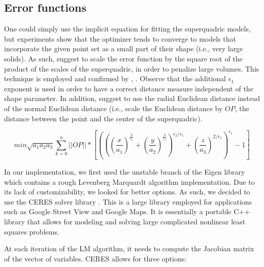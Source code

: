 \documentclass{article}
\begin{document}
\subsection*{Error functions}

One could simply use the implicit equation for fitting the superquadric models, but experiments show that the optimizer tends to converge to models that incorporate the given point set as a small part of their shape (i.e., very large solids). As such, \cite{SQ_2000} suggest to scale the error function by the square root of the product of the scales of the superquadric, in order to penalize large volumes. This technique is employed and confirmed by \cite{journals/pami/KatsoulasBK08}, \cite{conf/wscg/ChevalierJB03}. Observe that the additional $\epsilon_1$ exponent is used in order to have a correct distance measure independent of the shape parameter. In addition, \cite{conf/wscg/ChevalierJB03} suggest to use the radial Euclidean distance instead of the normal Euclidean distance (i.e., scale the Euclidean distance by $OP$, the distance between the point and the center of the superquadric).

\begin{equation}
min \sqrt {a_1 a_2 a_3} \sum_{k=0}^n ||OP|| * \left[ \left( \left( \left( \frac{x}{a_1}\right)^{\frac{2}{\epsilon_2}} + \left( \frac{y}{a_2} \right) ^{\frac{2}{\epsilon_2}} \right)^{\epsilon_2 / \epsilon_1} + \left( \frac{z}{a_3} \right) ^{2/\epsilon_1} \right) ^{\epsilon_1} - 1 \right]
\end{equation}


In our implementation, we first used the unstable branch of the Eigen library \cite{eigenweb} which contains a rough Levenberg Marquardt algorithm implementation. Due to its lack of customizability, we looked for better options. As such, we decided to use the CERES solver library \cite{ceres-solver}. This is a large library employed for applications such as Google Street View and Google Maps. It is essentially a portable C++ library that allows for modeling and solving large complicated nonlinear least squares problems.

At each iteration of the LM algorithm, it needs to compute the Jacobian matrix of the vector of variables. CERES allows for three options:
\end{document}
